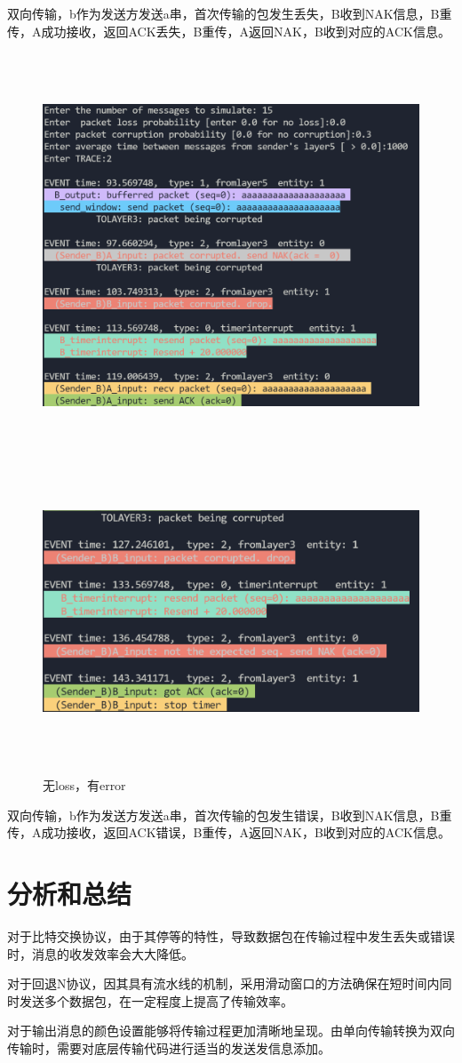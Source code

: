 \documentclass[UTF8,14pt]{article}
\numberwithin{figure}{section}
\begin{document}
双向传输，b作为发送方发送a串，首次传输的包发生丢失，B收到NAK信息，B重传，A成功接收，返回ACK丢失，B重传，A返回NAK，B收到对应的ACK信息。
\newpage
\begin{figure}[!htbp]
      \centering
      \setlength{\abovecaptionskip}{0.cm}
      \includegraphics[width=15cm,height=12.06cm]{gbn2_1.png}
      \includegraphics[width=15cm,height=8.89cm]{gbn2_2.png}
      \caption{无loss，有error}
\end{figure}

双向传输，b作为发送方发送a串，首次传输的包发生错误，B收到NAK信息，B重传，A成功接收，返回ACK错误，B重传，A返回NAK，B收到对应的ACK信息。
\newpage
\section{分析和总结}
对于比特交换协议，由于其停等的特性，导致数据包在传输过程中发生丢失或错误时，消息的收发效率会大大降低。

对于回退N协议，因其具有流水线的机制，采用滑动窗口的方法确保在短时间内同时发送多个数据包，在一定程度上提高了传输效率。

对于输出消息的颜色设置能够将传输过程更加清晰地呈现。由单向传输转换为双向传输时，需要对底层传输代码进行适当的发送发信息添加。
\end{document}
